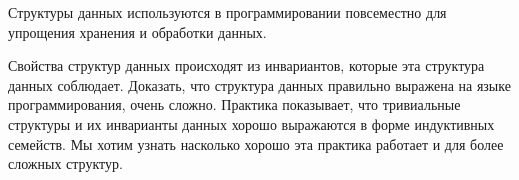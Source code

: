 \startprefacepage

Структуры данных используются в программировании повсеместно для
упрощения хранения и обработки данных.

Свойства структур данных происходят из инвариантов, которые эта структура
данных соблюдает.
Доказать, что структура данных правильно выражена на языке программирования,
очень сложно.
Практика показывает, что тривиальные структуры и их инварианты
данных хорошо выражаются в форме индуктивных семейств.
Мы хотим узнать насколько хорошо эта практика работает и для более сложных
структур.

\iffalse
hello world iffalse test
\newline
\fi


